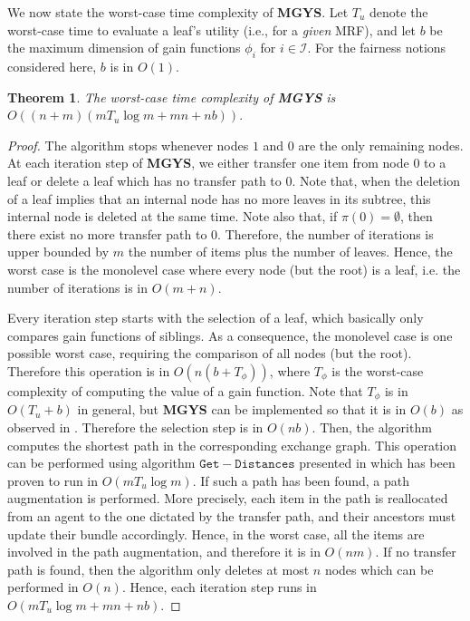 \documentclass[]{article}
\newtheorem{theorem}{Theorem}
\newcommand{\internal}{\mathcal{I}}
\begin{document}
We now state the worst-case time complexity of {\bf MGYS}. Let $T_u$ denote the worst-case time to evaluate a leaf’s utility (i.e., for a \emph{given} MRF), and let $b$ be the maximum dimension of gain functions $\phi_i$ for $i \in \internal$. For the fairness notions considered here, $b$ is in $O(1)$.

\begin{theorem} \label{theorem: complexity mgys}
    The worst-case time complexity of {\bf MGYS} is  $O((n + m)(m T_u \log m +  mn+ nb)).$
\end{theorem}

\begin{proof} The algorithm stops whenever nodes $1$ and $0$ are the only remaining nodes. At each iteration step of \textbf{MGYS}, we either transfer one item from node $0$ to a leaf or delete a leaf which has no transfer path to $0$. Note that, when the deletion of a leaf implies that an internal node has no more leaves in its subtree, this internal node is deleted at the same time. Note also that, if $\pi(0)=\emptyset$, then there exist no more transfer path to $0$. Therefore, the number of iterations is upper bounded by $m$ the number of items plus the number of leaves. Hence, the worst case is the monolevel case where every node (but the root) is a leaf, i.e. the number of iterations is in $O(m + n)$. 

Every iteration step starts with the selection of a leaf, which basically only compares gain functions of siblings. As a consequence, the monolevel case is one possible worst case, requiring the comparison of all nodes (but the root). Therefore this operation is in $O(n(b + T_\phi))$, where $T_\phi$ is the worst-case complexity of computing the value of a gain function. Note that $T_\phi$ is in $O(T_u+b)$ in general, but {\bf MGYS} can be implemented so that it is in $O(b)$ as observed in \cite{Viswanathan_Zick2023b}. Therefore the selection step is in $O(nb)$. Then, the algorithm computes the shortest path in the corresponding exchange graph. This operation can be performed using algorithm $\mathtt{Get-Distances}$ presented in \cite{Viswanathan_Zick2023b} which has been proven to run in $O(m T_u \log m)$. If such a path has been found, a path augmentation is performed. More precisely, each item in the path is reallocated from an agent to the one dictated by the transfer path, and their ancestors must update their bundle accordingly. Hence, in the worst case, all the items are involved in the path augmentation, and therefore it is in $O(nm)$. If no transfer path is found, then the algorithm only deletes at most $n$ nodes which can be performed in $O(n)$. Hence, each iteration step runs in $O(m T_u \log m + mn + nb)$.  
\end{proof}
\end{document}

